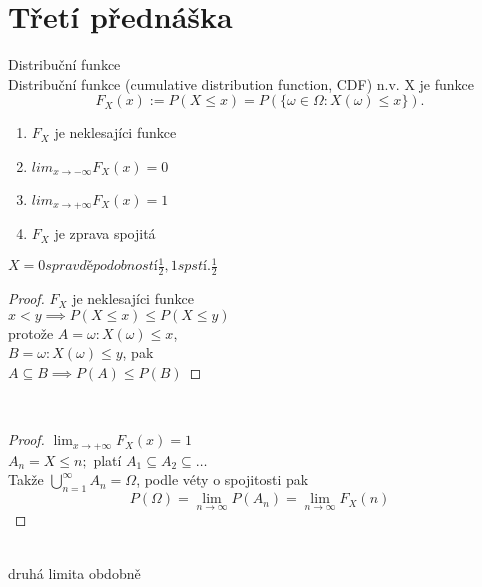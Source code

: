 \documentclass[../main.tex]{subfiles}
\begin{document}
\section{Třetí přednáška}

\begin{definition}
    Distribuční funkce\\
    Distribuční funkce (cumulative distribution function, CDF) n.v. X
    je funkce
    \[F_X(x) := P(X\leq x) = P(\{\omega \in \Omega : X(\omega) \leq x\}).\]
    \begin{enumerate}
        \item $F_X$ je neklesajíci funkce
        \item $lim_{x \rightarrow -\infty} F_X(x) = 0$
        \item $lim_{x \rightarrow +\infty} F_X(x) = 1$
        \item $F_X$ je zprava spojitá
    \end{enumerate}
\end{definition}
\begin{example}
    $X = {0 s pravděpodobností \frac{1}{2}, 1 s pstí. \frac{1}{2}}$
\end{example}
\begin{proof}
    $F_X$ je neklesajíci funkce\\

    $x<y \implies P(X\leq x) \leq P(X\leq y)$\\
    protože $A = {\omega : X(\omega) \leq x}$,\\
    $B = {\omega : X(\omega) \leq y}$, pak\\
    $A\subseteq B \implies P(A) \leq P(B)$
\end{proof}\\
\begin{proof}
    $\lim_{x\rightarrow +\infty} F_X(x) = 1$\\

    $A_n = {X\leq n};$ platí $A_1 \subseteq A_2 \subseteq \dots$\\
    Takže $\bigcup^\infty_{n=1} A_n = \Omega$, podle véty o spojitosti pak\\
    \[P(\Omega) = \lim_{n\rightarrow \infty} P(A_n) = \lim_{n\rightarrow \infty} F_X(n)\]
\end{proof}\\
druhá limita obdobně
\end{document}
